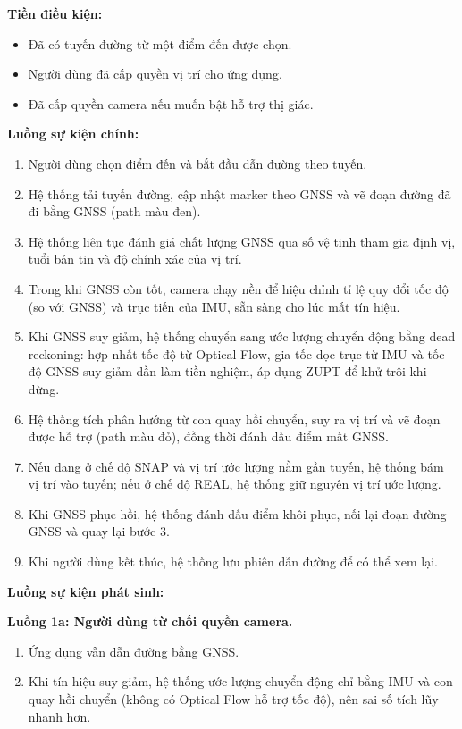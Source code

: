 \documentclass[../DoAn.tex]{subfiles}
\begin{document}
\textbf{Tiền điều kiện:}
\begin{itemize}
    \item Đã có tuyến đường từ một điểm đến được chọn.
    \item Người dùng đã cấp quyền vị trí cho ứng dụng.
    \item Đã cấp quyền camera nếu muốn bật hỗ trợ thị giác.
\end{itemize}

\textbf{Luồng sự kiện chính:}
\begin{enumerate}
    \item Người dùng chọn điểm đến và bắt đầu dẫn đường theo tuyến.
    \item Hệ thống tải tuyến đường, cập nhật marker theo GNSS và vẽ đoạn đường đã đi bằng GNSS (path màu đen).
    \item Hệ thống liên tục đánh giá chất lượng GNSS qua số vệ tinh tham gia định vị, tuổi bản tin và độ chính xác của vị trí.
    \item Trong khi GNSS còn tốt, camera chạy nền để hiệu chỉnh tỉ lệ quy đổi tốc độ (so với GNSS) và trục tiến của IMU, sẵn sàng cho lúc mất tín hiệu.
    \item Khi GNSS suy giảm, hệ thống chuyển sang ước lượng chuyển động bằng dead reckoning: hợp nhất tốc độ từ Optical Flow, gia tốc dọc trục từ IMU và tốc độ GNSS suy giảm dần làm tiền nghiệm, áp dụng ZUPT để khử trôi khi dừng.
    \item Hệ thống tích phân hướng từ con quay hồi chuyển, suy ra vị trí và vẽ đoạn được hỗ trợ (path màu đỏ), đồng thời đánh dấu điểm mất GNSS.
    \item Nếu đang ở chế độ SNAP và vị trí ước lượng nằm gần tuyến, hệ thống bám vị trí vào tuyến; nếu ở chế độ REAL, hệ thống giữ nguyên vị trí ước lượng.
    \item Khi GNSS phục hồi, hệ thống đánh dấu điểm khôi phục, nối lại đoạn đường GNSS và quay lại bước 3.
    \item Khi người dùng kết thúc, hệ thống lưu phiên dẫn đường để có thể xem lại.
\end{enumerate}

\textbf{Luồng sự kiện phát sinh:}

\textbf{Luồng 1a: Người dùng từ chối quyền camera.}
\begin{enumerate}[label=1a.\arabic*., leftmargin=2.6em, align=left, labelsep=0.5em]
    \item Ứng dụng vẫn dẫn đường bằng GNSS.
    \item Khi tín hiệu suy giảm, hệ thống ước lượng chuyển động chỉ bằng IMU và con quay hồi chuyển (không có Optical Flow hỗ trợ tốc độ), nên sai số tích lũy nhanh hơn.
\end{enumerate}
\end{document}
